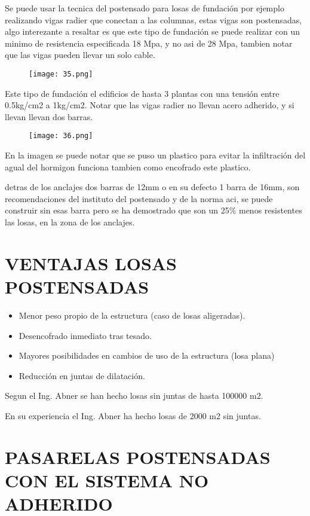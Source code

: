 Se puede usar la tecnica del postensado para losas
de fundación por ejemplo realizando vigas radier que conectan
a las columnas, estas vigas son postensadas, algo interezante
a resaltar es que este tipo de fundación se puede realizar
con un minimo de resistencia especificada 18 Mpa, y no asi
de 28 Mpa, tambien notar que las vigas pueden llevar un
solo cable.

\begin{figure}[H]
\centering
\texttt{[image: 35.png]}
\end{figure}

Este tipo de fundación el edificios de hasta 3 plantas
con una tensión entre 0.5kg/cm2 a 1kg/cm2.
Notar que las vigas radier no llevan acero adherido,
y si llevan llevan dos barras.

\begin{figure}[H]
\centering
\texttt{[image: 36.png]}
\end{figure}

En la imagen se puede notar que se puso un plastico
para evitar la infiltración del agual del hormigon
funciona tambien como encofrado este plastico.

detras de los anclajes dos barras de 12mm o en su defecto
1 barra de 16mm, son recomendaciones del instituto del
postensado y de la norma aci, se puede construir sin
esas barra pero se ha demostrado que son un 25\% menos 
resistentes las losas, en la zona de los anclajes.

\section{VENTAJAS LOSAS POSTENSADAS}

\begin{itemize}
	\item Menor peso propio de la estructura (caso de losas aligeradas).
	\item Desencofrado inmediato tras tesado.
	\item Mayores posibilidades en cambios de uso de la estructura (losa plana)
	\item Reducción en juntas de dilatación.
\end{itemize}

Segun el Ing. Abner se han hecho losas sin juntas de hasta 100000 m2.

En su experiencia el Ing. Abner ha hecho losas de 2000 m2 sin juntas.

\section{PASARELAS POSTENSADAS CON EL SISTEMA NO ADHERIDO}

